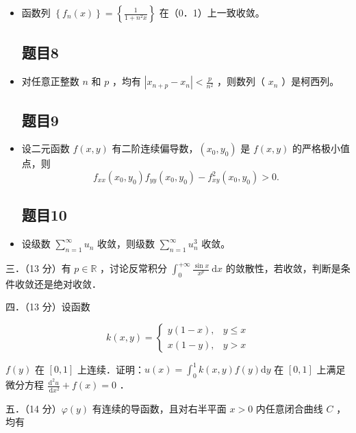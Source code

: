 \documentclass{article}
\begin{document}
\begin{itemize}

\subsection{题目7}
  \item[1．] 函数列 \(\left\{f_{n}(x)\right\}=\left\{\frac{1}{1+n^{2} x}\right\}\) 在（0．1）上一致收敛。

\subsection{题目8}
  \item[2．] 对任意正整数 \(n\) 和 \(p\) ，均有 \(\left|x_{n+p}-x_{n}\right|<\frac{p}{n^{2}}\) ，则数列（ \(x_{n}\) ）是柯西列。

\subsection{题目9}
  \item[3．] 设二元函数 \(f(x, y)\) 有二阶连续偏导数，\(\left(x_{0}, y_{0}\right)\) 是 \(f(x, y)\) 的严格极小值点，则
\[
f_{x x}\left(x_{0}, y_{0}\right) f_{y y}\left(x_{0}, y_{0}\right)-f_{x y}^{2}\left(x_{0}, y_{0}\right)>0 .
\]

\subsection{题目10}
  \item[4．] 设级数 \(\sum_{n=1}^{\infty} u_{n}\) 收敛，则级数 \(\sum_{n=1}^{\infty} u_{n}^{3}\) 收敛。
\end{itemize}

三．（13 分）有 \(p \in \mathbb{R}\) ，讨论反常积分 \(\int_{0}^{+\infty} \frac{\sin x}{x^{p}} \mathrm{~d} x\) 的敛散性，若收敛，判断是条件收敛还是绝对收敛．

四．（13 分）设函数

\[
k(x, y)= \begin{cases}y(1-x), & y \leq x \\ x(1-y), & y>x\end{cases}
\]

\(f(y)\) 在 \([0,1]\) 上连续．证明：\(u(x)=\int_{0}^{1} k(x, y) f(y) \mathrm{d} y\) 在 \([0,1]\) 上满足微分方程 \(\frac{\mathrm{d}^{2} u}{\mathrm{~d} x^{2}}+f(x)=0\) ．

五．（14 分）\(\varphi(y)\) 有连续的导函数，且对右半平面 \(x>0\) 内任意闭合曲线 \(C\) ，均有
\end{document}
